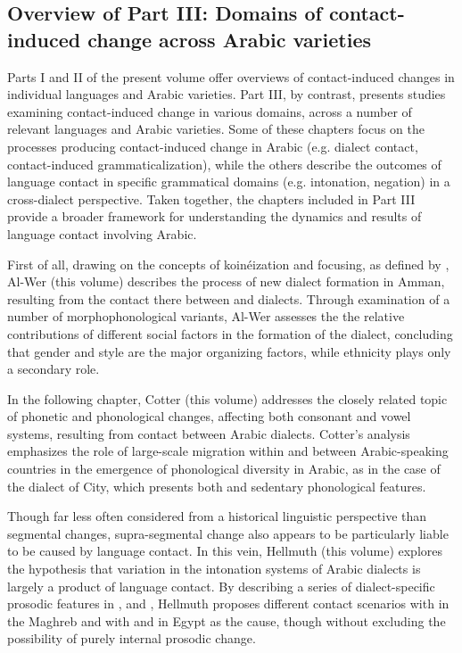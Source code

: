 \documentclass[output=paper]{langsci/langscibook}
\begin{document}
\subsection{Overview of Part III: Domains of contact-induced
change across Arabic varieties}\label{intropartIIIoverview}
Parts I and II of the present volume offer overviews of contact-induced changes in individual languages and Arabic varieties. Part III, by contrast, presents studies examining contact-induced change in various domains, across a number of relevant languages and Arabic varieties. Some of these chapters focus on the processes producing contact-induced change in Arabic (e.g. dialect contact, contact-induced grammaticalization), while the others describe the outcomes of language contact in specific grammatical domains (e.g. intonation, negation) in a cross-dialect perspective. Taken together, the chapters included in Part III provide a broader framework for understanding the dynamics and results of language contact involving Arabic. 

First of all, drawing on the concepts of koinéization and focusing, as defined by \citet{Trudgill2004}, Al-Wer (this volume) describes the process of new dialect formation in Amman, resulting from the contact there between  and  dialects. Through examination of a number of morphophonological variants, Al-Wer assesses the the relative contributions of different social factors in the formation of the  dialect, concluding that gender and style are the major organizing factors, while ethnicity plays only a secondary role.

In the following chapter, Cotter (this volume) addresses the closely related topic of phonetic and phonological changes, affecting both consonant and vowel systems, resulting from  contact between Arabic dialects. Cotter's analysis emphasizes the role of large-scale migration within and between Arabic-speaking countries in the emergence of phonological diversity in Arabic, as in the case of the dialect of  City, which presents both  and sedentary phonological features.

Though far less often considered from a historical linguistic perspective than segmental changes, supra-segmental change also appears to be particularly liable to be caused by language contact. In this vein, Hellmuth (this volume) explores the hypothesis that variation in the intonation systems of Arabic dialects is largely a product of language contact. By describing a series of dialect-specific prosodic features in ,  and , Hellmuth proposes different contact scenarios with  in the Maghreb and with  and  in Egypt as the cause, though without excluding the possibility of purely internal prosodic change. 
\end{document}
